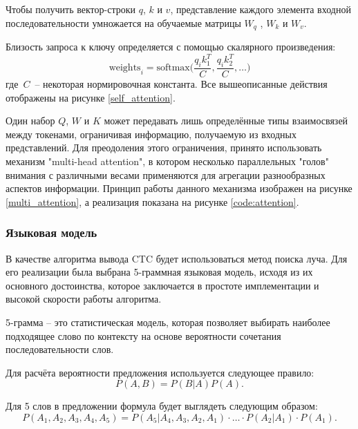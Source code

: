 Чтобы получить вектор-строки $q$, $k$ и $v$, представление каждого элемента входной последовательности умножается на обучаемые матрицы $W_q$ , $W_k$ и $W_v$.

Близость запроса к ключу определяется с помощью скалярного произведения:
\begin{equation}
    \text{weights}_i = \text{softmax}\biggl(\dfrac{q_ik_1^T}{C},\dfrac{q_ik_2^T}{C},\dots\biggr)
\end{equation}
где $C$ – некоторая нормировочная константа. Все вышеописанные действия отображены на рисунке \ref{self_attention}.


Один набор $Q$, $W$ и $K$ может передавать лишь определённые типы взаимосвязей между токенами, ограничивая информацию, получаемую из входных представлений. Для преодоления этого ограничения, принято использовать механизм "multi-head attention", в котором несколько параллельных "голов" внима\-ния с различными весами применяются для агрегации разнообразных аспектов информации. Принцип работы данного механизма изображен на рисунке \ref{multi_attention}, а реализация показана на рисунке \ref{code:attention}.




\subsubsection{Языковая модель}

В качестве алгоритма вывода CTC будет использоваться метод поиска луча. Для его реализации была выбрана 5-граммная языковая модель, исходя из их основного достоинства, которое заключается в простоте имплементации и высокой скорости работы алгоритма.

5-грамма – это статистическая модель, которая позволяет выбирать наиболее подходящее слово по контексту на основе вероятности сочетания последовательности слов.

Для расчёта вероятности предложения используется следующее правило:
\begin{equation}
    P(A,B) = P(B|A)P(A).
\end{equation}

Для 5 слов в предложении формула будет выглядеть следующим образом:
\begin{equation}
    P(A_1,A_2,A_3,A_4,A_5) = P(A_5|A_4,A_3,A_2,A_1)\cdot\ldots\cdot P(A_2|A_1)\cdot P(A_1).
\end{equation}

